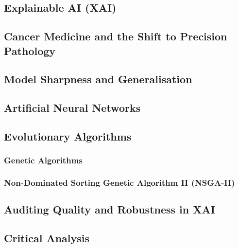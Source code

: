 \label{sec:literature}

\subsection{Explainable AI (XAI)}


\subsection{Cancer Medicine and the Shift to Precision Pathology}


\subsection{Model Sharpness and Generalisation}


\subsection{Artificial Neural Networks}


\subsection{Evolutionary Algorithms}


\subsubsection{Genetic Algorithms}


\subsubsection{Non-Dominated Sorting Genetic Algorithm II (NSGA-II)}


\subsection{Auditing Quality and Robustness in XAI}


\subsection{Critical Analysis}
